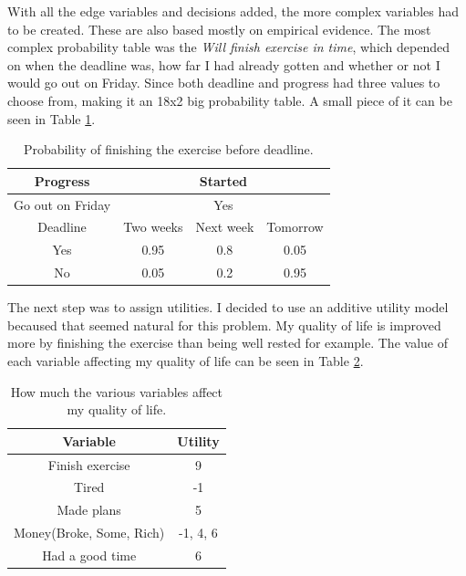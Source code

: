 \documentclass{article}
\begin{document}
    With all the edge variables and decisions added, the more complex variables
    had to be created. These are also based mostly on empirical evidence. The
    most complex probability table was the \emph{Will finish exercise in time},
    which depended on when the deadline was, how far I had already gotten and
    whether or not I would go out on Friday. Since both deadline and progress
    had three values to choose from, making it an 18x2 big probability table. A
    small piece of it can be seen in Table \ref{tab:prob}.

    \begin{table}[ht]
        \centering
        \begin{tabular}{| c | c | c | c |}\hline
            Progress & \multicolumn{3}{|c|}{Started}\\ \hline

            Go out on Friday & \multicolumn{3}{|c|}{Yes} \\ \hline

            Deadline & Two weeks & Next week & Tomorrow\\ \hline

            Yes & 0.95 & 0.8 & 0.05\\ \hline

            No & 0.05 & 0.2 & 0.95\\ \hline
        \end{tabular}
        \caption{Probability of finishing the exercise before deadline.}
        \label{tab:prob}
    \end{table}

    The next step was to assign utilities. I decided to use an additive utility
    model becaused that seemed natural for this problem. My quality of life is
    improved more by finishing the exercise than being well rested for example.
    The value of each variable affecting my quality of life can be seen in
    Table \ref{tab:utility}. 

    \begin{table}[ht]
        \centering
        \begin{tabular}{| c | c |}\hline
            Variable &  Utility\\\hline
            Finish exercise & 9\\ \hline
            Tired & -1\\ \hline
            Made plans & 5\\ \hline
            Money(Broke, Some, Rich) & -1, 4, 6\\\hline
            Had a good time & 6\\\hline
        \end{tabular}
        \caption{How much the various variables affect my quality of life.}
        \label{tab:utility}
    \end{table}
    
\end{document}
